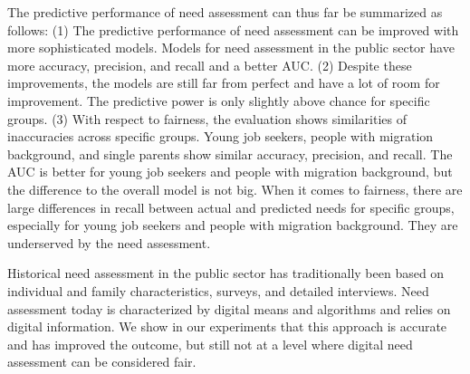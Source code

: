 \documentclass{article} %
\begin{document}
\begin{table}[!ht]
\centering
\caption{Performance of Need Assessment}
\label{tab:prediction}
\end{table}

The predictive performance of need assessment can thus far be summarized as follows: (1) The predictive performance of need assessment can be improved with more sophisticated models. Models for need assessment in the public sector have more accuracy, precision, and recall and a better AUC. (2) Despite these improvements, the models are still far from perfect and have a lot of room for improvement. The predictive power is only slightly above chance for specific groups. (3) With respect to fairness, the evaluation shows similarities of inaccuracies across specific groups. Young job seekers, people with migration background, and single parents show similar accuracy, precision, and recall. The AUC is better for young job seekers and people with migration background, but the difference to the overall model is not big. When it comes to fairness, there are large differences in recall between actual and predicted needs for specific groups, especially for young job seekers and people with migration background. They are underserved by the need assessment.

Historical need assessment in the public sector has traditionally been based on individual and family characteristics, surveys, and detailed interviews. Need assessment today is characterized by digital means and algorithms and relies on digital information. We show in our experiments that this approach is accurate and has improved the outcome, but still not at a level where digital need assessment can be considered fair.
\end{document}
